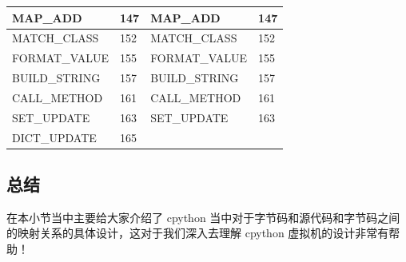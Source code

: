 \begin{table}[H]
\begin{tabular}{|l|l|l|l|}
      MAP\_ADD & 147 &MAP\_ADD & 147 \\ \hline
      MATCH\_CLASS & 152 &MATCH\_CLASS & 152 \\ \hline
      FORMAT\_VALUE & 155 &FORMAT\_VALUE & 155 \\ \hline
      BUILD\_STRING & 157 &BUILD\_STRING & 157 \\ \hline
      CALL\_METHOD & 161 &CALL\_METHOD & 161 \\ \hline
      SET\_UPDATE & 163 &SET\_UPDATE & 163 \\ \hline
      DICT\_UPDATE & 165 & & \\ \hline
        \end{tabular}
\end{table}
\subsection{总结}
在本小节当中主要给大家介绍了 cpython 当中对于字节码和源代码和字节码之间的映射关系的具体设计，这对于我们深入去理解 cpython 虚拟机的设计非常有帮助！
